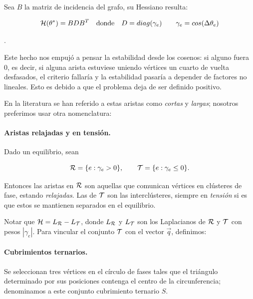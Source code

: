 Sea $B$ la matriz de incidencia del grafo, su Hessiano resulta:


\begin{equation}
    \mathcal{H}(\theta^*) = B D B^T \quad \text{donde} \quad D = diag(\gamma_e) \qquad \gamma_e = cos(\Delta{\theta_e)}
\end{equation}

\cite{bronski2015graphhomologystabilitycoupled}.

Este hecho nos empujó a pensar la estabilidad desde los cosenos: si alguno fuera 0, es decir, si alguna arista estuviese uniendo vértices un cuarto de vuelta desfasados, el criterio fallaría y la estabilidad pasaría a depender de factores no lineales. Esto es debido a que el problema deja de ser definido positivo.

En la literatura se han referido a estas aristas como \emph{cortas} y \emph{largas}; nosotros preferimos usar otra nomenclatura:
\paragraph{Aristas relajadas y en tensión.} Dado un equilibrio, sean
\begin{eqbox}\[
\mathcal{R}=\{e:\gamma_e>0\},\qquad \mathcal{T}=\{e:\gamma_e\le 0\}.
\]\end{eqbox}
Entonces las aristas en $\mathcal{R}$ son aquellas que comunican vértices en clústeres de fase, estando \emph{relajadas}. Las de $\mathcal{T}$ son las interclústeres, siempre en \emph{tensión} si es que estos se mantienen separados en el equilibrio.

Notar que $\mathcal{H}=L_{\mathcal{R}}-L_{\mathcal{T}}$, donde $L_{\mathcal{R}}$ y $L_{\mathcal{T}}$ son los Laplacianos de $\mathcal{R}$ y $\mathcal{T}$ con pesos $|\gamma_e|$. Para vincular el conjunto $\mathcal{T}$ con el vector $\vec{q}$, definimos:

\paragraph{Cubrimientos ternarios.} 

Se seleccionan tres vértices en el círculo de fases tales que el triángulo determinado por sus posiciones contenga el centro de la circunferencia; denominamos a este conjunto cubrimiento ternario $S$. 

